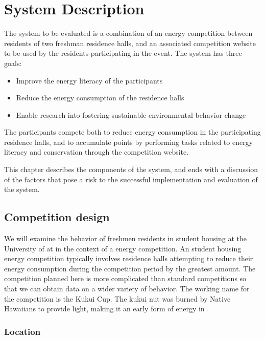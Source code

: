 \chapter{System Description}
\label{cha:system-description}

The system to be evaluated is a combination of an energy competition between residents of two freshman residence halls, and an associated competition website to be used by the residents participating in the event. The system has three goals:

\begin{itemize}
	\item Improve the energy literacy of the participants
	\item Reduce the energy consumption of the residence halls
	\item Enable research into fostering sustainable environmental behavior change
\end{itemize}

The participants compete both to reduce energy consumption in the participating residence halls, and to accumulate points by performing tasks related to energy literacy and conservation through the competition website.

This chapter describes the components of the system, and ends with a discussion of the factors that pose a risk to the successful implementation and evaluation of the system.

\section{Competition design}

We will examine the behavior of freshmen residents in student housing at the University of \Hawaii at \Manoa in the context of a energy competition. An student housing energy competition typically involves residence halls attempting to reduce their energy consumption during the competition period by the greatest amount. The competition planned here is more complicated than standard competitions so that we can obtain data on a wider variety of behavior. The working name for the competition is the Kukui Cup. The kukui nut was burned by Native Hawaiians to provide light, making it an early form of energy in \Hawaii.

\subsection{Location}

